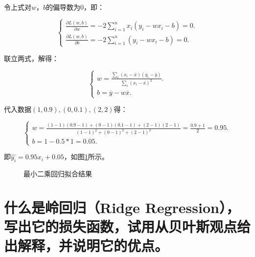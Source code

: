 \documentclass{article}
\begin{document}
令上式对$w$，$b$的偏导数为0，即：

\begin{equation}
    \begin{cases}
        \frac{\partial L(w,b)}{\partial w}=-2\sum_{i=1}^{n}x_i(y_i-wx_i-b)=0. \\
        \frac{\partial L(w,b)}{\partial b}=-2\sum_{i=1}^{n}(y_i-wx_i-b)=0.
    \end{cases}
\end{equation}

联立两式，解得：

\begin{equation}
    \begin{cases}
        w=\frac{\sum_i(x_i-\overline{x})(y_i-\overline{y})}{\sum_i{(x_i-\overline{x})^2}}. \\
        b=\overline{y}-w\overline{x}.
    \end{cases}
\end{equation}

代入数据$(1,0.9),(0,0.1),(2,2)$得：

\begin{equation}
    \begin{cases}
        w=\frac{(1-1)(0.9-1)+(0-1)(0.1-1)+(2-1)(2-1)}{(1-1)^2+(0-1)^2+(2-1)^2}=\frac{0.9+1}{2}=0.95. \\
        b=1-0.5*1=0.05.
    \end{cases}
\end{equation}

即$\hat{y_i}=0.95x_i+0.05$，如图\ref{fig:lsr}所示。

\begin{figure}[h]
\centering
{}
\caption{最小二乘回归拟合结果}
\label{fig:lsr}
\end{figure}

\section{什么是岭回归（Ridge Regression），写出它的损失函数，试用从贝叶斯观点给出解释，并说明它的优点。}
\end{document}
